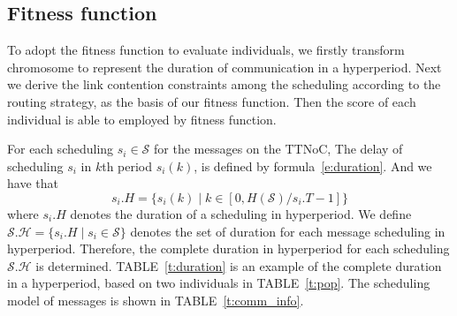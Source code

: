 \documentclass[journal]{IEEEtran}
\newcommand{\calS}{\mathcal{S}}
\newcommand{\calH}{\mathcal{H}}
\theoremstyle{remark}
\begin{document}
\subsection{Fitness function \label{s:fit}}

To adopt the fitness function to evaluate individuals,
 we firstly transform chromosome to represent the duration of communication in a hyperperiod.
Next we derive the link contention constraints among the scheduling according to the routing strategy,
 as the basis of our fitness function.
Then the score of each individual is able to employed by fitness function.

For each scheduling $s_i \in \calS$ for the messages on the TTNoC,
 The delay of scheduling $s_i$ in $k$th period $s_i(k)$, is defined by formula~\ref{e:duration}.
And we have that
\begin{equation}
	s_i.H = \{ s_i(k) \mid k \in [ 0, H(\calS)/s_i.T - 1 ] \}
\end{equation}
where $s_i.H$ denotes the duration of a scheduling in hyperperiod.
We define 
 $ \calS.\calH = \{ s_i.H \mid s_i \in \calS \}$
 denotes the set of duration for each message scheduling in hyperperiod. 
Therefore,
 the complete duration in hyperperiod for each scheduling $ \calS.\calH $ is determined.
TABLE~\ref{t:duration} is an example of the complete duration in a hyperperiod,
 based on two individuals in TABLE~\ref{t:pop}.
The scheduling model of messages is shown in TABLE~\ref{t:comm_info}.
\end{document}
